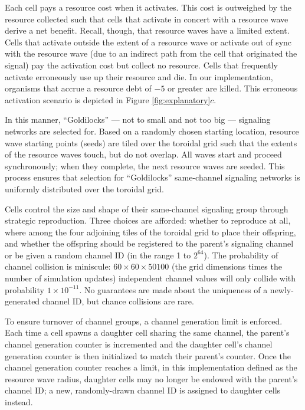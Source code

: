 Each cell pays a resource cost when it activates.
This cost is outweighed by the resource collected such that cells that activate in concert with a resource wave derive a net benefit.
Recall, though, that resource waves have a limited extent.
Cells that activate outside the extent of a resource wave or activate out of sync with the resource wave (due to an indirect path from the cell that originated the signal) pay the activation cost but collect no resource.
Cells that frequently activate erroneously use up their resource and die.
In our implementation, organisms that accrue a resource debt of $-5$ or greater are killed.
This erroneous activation scenario is depicted in Figure \ref{fig:explanatory}$c$.

In this manner, ``Goldilocks'' --- not to small and not too big --- signaling networks are selected for.
Based on a randomly chosen starting location, resource wave starting points (seeds) are tiled over the toroidal grid such that the extents of the resource waves touch, but do not overlap.
All waves start and proceed synchronously;
when they complete, the next resource waves are seeded.
This process ensures that selection for ``Goldilocks'' same-channel signaling networks is uniformly distributed over the toroidal grid.

Cells control the size and shape of their same-channel signaling group through strategic reproduction.
Three choices are afforded: whether to reproduce at all, where among the four adjoining tiles of the toroidal grid to place their offspring, and whether the offspring should be registered to the parent's signaling channel or be given a random channel ID (in the range 1 to $2^{64}$).
The probability of channel collision is miniscule: $60 \times 60 \times 50100$ (the grid dimensions times the number of simulation updates) independent channel values will only collide with probability $1 \times 10^{-11}$.
No guarantees are made about the uniqueness of a newly-generated channel ID, but chance collisions are rare.

To ensure turnover of channel groups, a channel generation limit is enforced.
Each time a cell spawns a daughter cell sharing the same channel, the parent's channel generation counter is incremented and the daughter cell's channel generation counter is then initialized to match their  parent's counter.
Once the channel generation counter reaches a limit, in this implementation defined as the resource wave radius, daughter cells may no longer be endowed with the parent's channel ID; a new, randomly-drawn channel ID is assigned to daughter cells instead.

